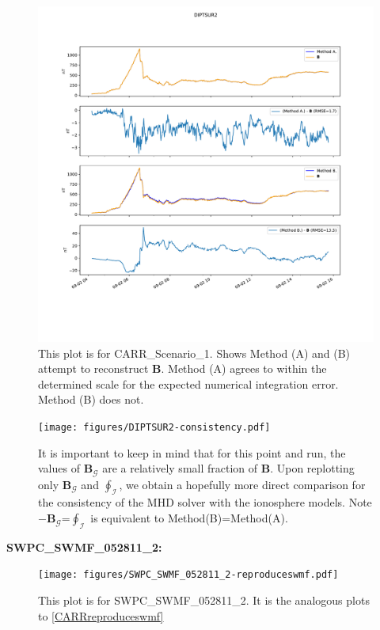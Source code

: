 \documentclass{article}
\newcommand\B{\mathbf{B}}
\newcommand\G{\mathcal{G}}
\newcommand\I{\mathcal{I}}
\begin{document}
\begin{figure}[H]
  \includegraphics[width=\textwidth]{figures/DIPTSUR2-compareAB.pdf}
  \caption{
  This plot is for CARR\_Scenario\_1.
Shows Method (A) and (B) attempt to reconstruct $\B$.
Method (A) agrees to within the determined scale for the expected numerical integration error.
Method (B) does not.
  }
  \label{CARRcompareAB}
\end{figure}

\begin{figure}[H]
  \texttt{[image: figures/DIPTSUR2-consistency.pdf]}
  \caption{
It is important to keep in mind that for this point and run,
the values of $\B_{\G}$ are a relatively small fraction of $\B$.
Upon replotting only $\B_{\G}$ and $\oint_{\I}$,
we obtain a hopefully more direct comparison for the consistency of the MHD solver with the ionosphere models.
Note $-\B_{\G}$=$\oint_{\I}$ is equivalent to Method(B)=Method(A).
  }
  \label{CARRconsistency}
\end{figure}

\textbf{SWPC\_SWMF\_052811\_2:}

\begin{figure}[H]
  \texttt{[image: figures/SWPC\_SWMF\_052811\_2-reproduceswmf.pdf]}
  \caption{
  This plot is for SWPC\_SWMF\_052811\_2.
  It is the analogous plots to \ref{CARRreproduceswmf}
  }
  \label{SWPCreproduceswmf}
\end{figure}
\end{document}
